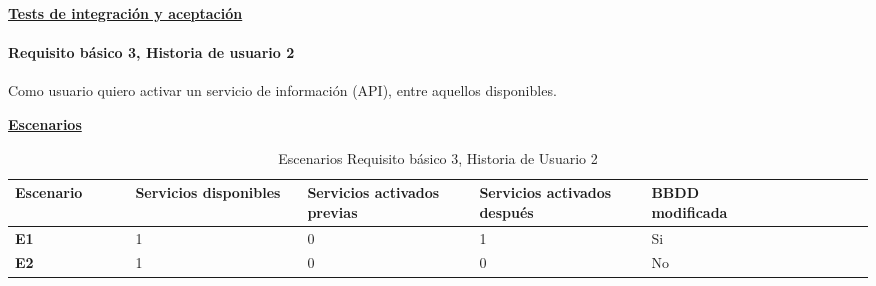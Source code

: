 \documentclass[../ei103948-project-documentation.tex]{subfiles}
\begin{document}
					\begin{center}
						\textbf{\underline{Tests de integración y aceptación}}
					\end{center}

					\testBasicoU
					\vspace*{5mm}

				\paragraph{Requisito básico 3, Historia de usuario 2}
				Como usuario quiero activar un servicio de información (API), entre aquellos disponibles. 

				\begin{center}
					\textbf{\underline{Escenarios}}
					\begin{table}[H]
						\centering
						\begin{tabular}{|p{0.14\linewidth}|p{0.20\linewidth}|p{0.20\linewidth}|p{0.20\linewidth}|p{0.12\linewidth}|p{0.12\linewidth}|p{0.12\linewidth}|}
							\hline
							\textbf{Escenario} & \textbf{Servicios disponibles} & \textbf{Servicios activados previas} & \textbf{Servicios activados después} & \textbf{BBDD modificada} \\ \hline
							\textbf{E1}        & 1                              & 0                                    & 1                                    & Si                       \\ \hline
							\textbf{E2}        & 1                              & 0                                    & 0                                    & No                       \\ \hline
							\end{tabular}
						\caption{Escenarios Requisito básico 3, Historia de Usuario 2}
					\end{table}

					\descripcionBasicaV


\end{center}
\end{document}
